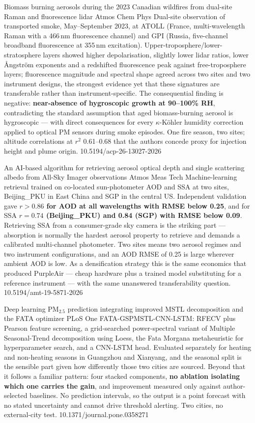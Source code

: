 \documentclass[10pt]{article}
\begin{document}
{Biomass burning aerosols during the 2023 Canadian wildfires from dual-site Raman and fluorescence lidar}
{Atmos Chem Phys}
{Dual-site observation of transported smoke, May--September 2023, at ATOLL (France,
multi-wavelength Raman with a 466\,nm fluorescence channel) and GPI (Russia, five-channel
broadband fluorescence at 355\,nm excitation). Upper-troposphere/lower-stratosphere layers
showed higher depolarisation, slightly lower lidar ratios, lower {\AA}ngstr\"om exponents
and a redshifted fluorescence peak against free-troposphere layers; fluorescence magnitude
and spectral shape agreed across two sites and two instrument designs, the strongest
evidence yet that these signatures are transferable rather than instrument-specific.
The consequential finding is negative: \textbf{near-absence of hygroscopic growth at
90--100\% RH}, contradicting the standard assumption that aged biomass-burning aerosol is
hygroscopic --- with direct consequences for every $\kappa$-K\"ohler humidity correction
applied to optical PM sensors during smoke episodes. One fire season, two sites;
altitude correlations at $r^2$ 0.61--0.68 that the authors concede proxy for injection
height and plume origin.}
{10.5194/acp-26-13027-2026}

{An AI-based algorithm for retrieving aerosol optical depth and single scattering albedo from All-Sky Imager observations}
{Atmos Meas Tech}
{Machine-learning retrieval trained on co-located sun-photometer AOD and SSA at two sites,
Beijing\_PKU in East China and SGP in the central US. Independent validation gave
\textbf{$r>0.86$ for AOD at all wavelengths with RMSE below 0.25}, and for SSA
\textbf{$r=0.74$ (Beijing\_PKU) and 0.84 (SGP) with RMSE below 0.09}. Retrieving SSA from a
consumer-grade sky camera is the striking part --- absorption is normally the hardest
aerosol property to retrieve and demands a calibrated multi-channel photometer. Two sites
means two aerosol regimes and two instrument configurations, and an AOD RMSE of 0.25 is
large wherever ambient AOD is low. As a densification strategy this is the same economics
that produced PurpleAir --- cheap hardware plus a trained model substituting for a
reference instrument --- with the same unanswered transferability question.}
{10.5194/amt-19-5871-2026}

{Deep learning PM$_{2.5}$ prediction integrating improved MSTL decomposition and the FATA optimizer}
{PLoS One}
{FATA-GSPMSTL-CNN-LSTM: RFECV plus Pearson feature screening, a grid-searched
power-spectral variant of Multiple Seasonal-Trend decomposition using Loess, the Fata
Morgana metaheuristic for hyperparameter search, and a CNN-LSTM head. Evaluated separately
for heating and non-heating seasons in Guangzhou and Xianyang, and the seasonal split is
the sensible part given how differently those two cities are sourced. Beyond that it
follows a familiar pattern: four stacked components, \textbf{no ablation isolating which
one carries the gain}, and improvement measured only against author-selected baselines.
No prediction intervals, so the output is a point forecast with no stated uncertainty and
cannot drive threshold alerting. Two cities, no external-city test.}
{10.1371/journal.pone.0358271}
\end{document}
